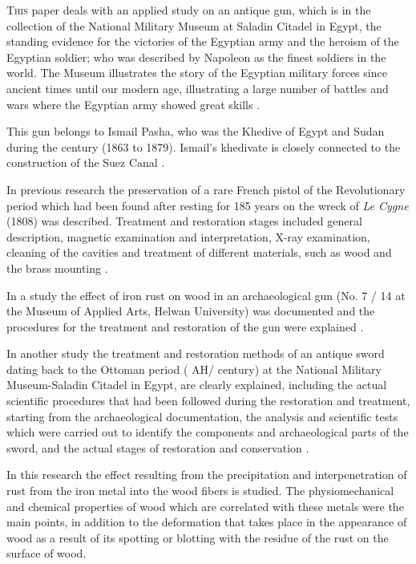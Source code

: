 	
\lettrine[nindent=0em,lines=3]{T}{his} paper deals with an applied study on an antique gun, which is in the collection of the National Military Museum at Saladin Citadel in Egypt, the standing evidence for the victories of the Egyptian army and the heroism of the Egyptian soldier; who was described by Napoleon as the finest soldiers in the world. The Museum illustrates the story of the Egyptian military forces since ancient times until our modern age, illustrating a large number of battles and wars where the Egyptian army showed great skills \parencite{Seaman_2013}.
	
	This gun belongs to Ismail Pasha, who was the Khedive of Egypt and Sudan during the  century (1863 to 1879). Ismail's khedivate is closely connected to the construction of the Suez Canal \parencite[49--55]{Dye_1880}. 
	
	In previous research the preservation of a rare French pistol of the Revolutionary period which had been found after resting for 185 years on the wreck of \textit{Le Cygne} (1808) was described. 
Treatment and restoration stages included general description, magnetic examination and interpretation, X-ray examination, cleaning of the cavities and treatment of different materials, such as wood and the brass mounting \parencite[161-169]{Mardikian_1996}. 
	
	In a study the effect of iron rust on wood in an archaeological gun (No. 7 / 14 at the Museum of Applied Arts, Helwan University) was documented and the procedures for the treatment and restoration of the gun were explained \parencites[285--290]{AboElgat_2010}[348--353]{Zidan_2011}.
	
	In another study the treatment and restoration methods of an antique sword dating back to the Ottoman period ( AH/ century\AD) at the National Military Museum-Saladin Citadel in Egypt, are clearly explained, including the actual scientific procedures that had been followed during the restoration and treatment, starting from the archaeological documentation, the analysis and scientific tests which were carried out to identify the components and archaeological parts of the sword, and the actual stages of restoration and conservation \parencite[1--6]{Zidan_2013}.
	
	In this research the effect resulting from the precipitation and interpenetration of rust from the iron metal into the wood fibers is studied. The physiomechanical and chemical properties of wood which are correlated with these metals were the main points, in addition to the deformation that takes place in the appearance of wood as a result of its spotting or blotting with the residue of the rust on the surface of wood.  
	
